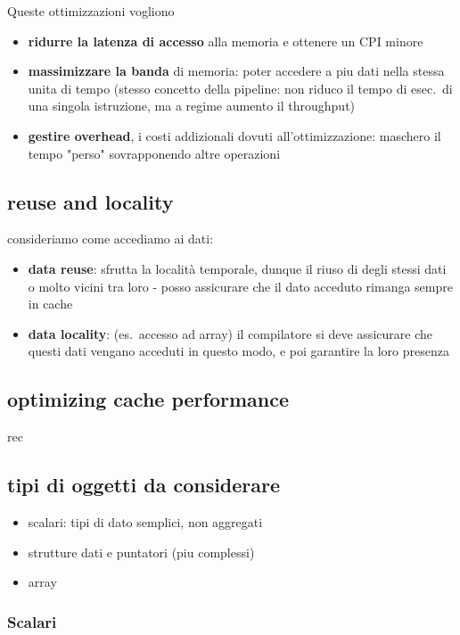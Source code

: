 Queste ottimizzazioni vogliono
\begin{itemize}
  \item \textbf{ridurre la latenza di accesso} alla memoria e ottenere un CPI minore
  \item \textbf{massimizzare la banda} di memoria: poter accedere a piu dati nella stessa unita di tempo (stesso concetto della pipeline: non riduco il tempo di esec.~di una singola istruzione, ma a regime aumento il throughput) 
  \item \textbf{gestire overhead}, i costi addizionali dovuti all'ottimizzazione: maschero il tempo "perso" sovrapponendo altre operazioni
\end{itemize}

\subsection{reuse and locality}

consideriamo come accediamo ai dati:
\begin{itemize}
  \item \textbf{data reuse}: sfrutta la localit\`a temporale, dunque il riuso di degli stessi dati o molto vicini tra loro - posso assicurare che il dato acceduto rimanga sempre in cache
  \item \textbf{data locality}: (es.~accesso ad array) il compilatore si deve assicurare che questi dati vengano acceduti in questo modo, e poi garantire la loro presenza
\end{itemize}

\subsection{optimizing cache performance}

rec

\subsection{tipi di oggetti da considerare}

\begin{itemize}
  \item scalari: tipi di dato semplici, non aggregati
  \item strutture dati e puntatori (piu complessi)
  \item array
\end{itemize}

\subsubsection{Scalari}

